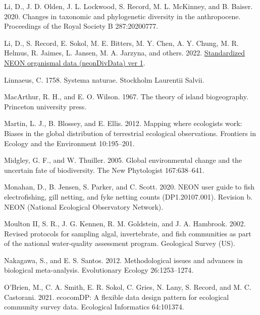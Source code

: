 \documentclass[
  12pt,
]{article}
\newlength{\cslhangindent}
\newlength{\cslentryspacingunit} %
\newenvironment{CSLReferences}[2] %
 {%
  \setlength{\parindent}{0pt}
  \ifodd #1
  \let\oldpar\par
  \def\par{\hangindent=\cslhangindent\oldpar}
  \fi
  \setlength{\parskip}{#2\cslentryspacingunit}
 }%
 {}
\begin{document}
\begin{CSLReferences}{1}{0}
\leavevmode{}%
Li, D., J. D. Olden, J. L. Lockwood, S. Record, M. L. McKinney, and B. Baiser. 2020. Changes in taxonomic and phylogenetic diversity in the anthropocene. Proceedings of the Royal Society B 287:20200777.

\leavevmode{}%
Li, D., S. Record, E. Sokol, M. E. Bitters, M. Y. Chen, A. Y. Chung, M. R. Helmus, R. Jaimes, L. Jansen, M. A. Jarzyna, and others. 2022. \href{https://doi.org/10.6073/pasta/c28dd4f6e7989003505ea02e9a92afbf}{Standardized NEON organismal data (neonDivData) ver 1}.

\leavevmode{}%
Linnaeus, C. 1758. Systema naturae. Stockholm Laurentii Salvii.

\leavevmode{}%
MacArthur, R. H., and E. O. Wilson. 1967. The theory of island biogeography. Princeton university press.

\leavevmode{}%
Martin, L. J., B. Blossey, and E. Ellis. 2012. Mapping where ecologists work: Biases in the global distribution of terrestrial ecological observations. Frontiers in Ecology and the Environment 10:195--201.

\leavevmode{}%
Midgley, G. F., and W. Thuiller. 2005. Global environmental change and the uncertain fate of biodiversity. The New Phytologist 167:638--641.

\leavevmode{}%
Monahan, D., B. Jensen, S. Parker, and C. Scott. 2020. NEON user guide to fish electrofishing, gill netting, and fyke netting counts (DP1.20107.001). Revision b. NEON (National Ecological Observatory Network).

\leavevmode{}%
Moulton II, S. R., J. G. Kennen, R. M. Goldstein, and J. A. Hambrook. 2002. Revised protocols for sampling algal, invertebrate, and fish communities as part of the national water-quality assessment program. Geological Survey (US).

\leavevmode{}%
Nakagawa, S., and E. S. Santos. 2012. Methodological issues and advances in biological meta-analysis. Evolutionary Ecology 26:1253--1274.

\leavevmode{}%
O'Brien, M., C. A. Smith, E. R. Sokol, C. Gries, N. Lany, S. Record, and M. C. Castorani. 2021. ecocomDP: A flexible data design pattern for ecological community survey data. Ecological Informatics 64:101374.


\end{CSLReferences}
\end{document}
